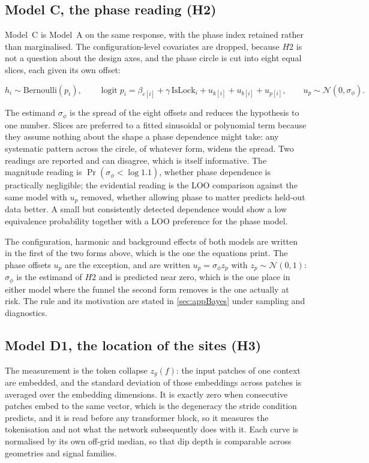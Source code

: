 \subsection{Model C, the phase reading (H2)}

Model~C is Model~A on the same response, with the phase index retained rather than marginalised. The configuration-level covariates are dropped, because $H2$ is not a question about the design axes, and the phase circle is cut into eight equal slices, each given its own offset:

\begin{equation*}
h_i \sim \mathrm{Bernoulli}(p_i),
\qquad
\operatorname{logit} p_i = \beta_{c[i]} + \gamma\,\mathrm{IsLock}_i + u_{k[i]} + u_{b[i]} + u_{p[i]},
\qquad
u_p \sim \mathcal{N}(0, \sigma_\phi).
\end{equation*}

The estimand $\sigma_\phi$ is the spread of the eight offsets and reduces the hypothesis to one number. Slices are preferred to a fitted sinusoidal or polynomial term because they assume nothing about the shape a phase dependence might take: any systematic pattern across the circle, of whatever form, widens the spread. Two readings are reported and can disagree, which is itself informative. The magnitude reading is $\Pr(\sigma_\phi<\log 1.1)$, whether phase dependence is practically negligible; the evidential reading is the LOO comparison against the same model with $u_p$ removed, whether allowing phase to matter predicts held-out data better. A small but consistently detected dependence would show a low equivalence probability together with a LOO preference for the phase model.

The configuration, harmonic and background effects of both models are written in the first of the two forms above, which is the one the equations print. The phase offsets $u_p$ are the exception, and are written $u_p=\sigma_\phi z_p$ with $z_p\sim\mathcal N(0,1)$: $\sigma_\phi$ is the estimand of $H2$ and is predicted near zero, which is the one place in either model where the funnel the second form removes is the one actually at risk. The rule and its motivation are stated in \autoref{sec:appBayes} under sampling and diagnostics.

\subsection{Model D1, the location of the sites (H3)}

The measurement is the token collapse $z_g(f)$: the input patches of one context are embedded, and the standard deviation of those embeddings across patches is averaged over the embedding dimensions. It is exactly zero when consecutive patches embed to the same vector, which is the degeneracy the stride condition predicts, and it is read before any transformer block, so it measures the tokenisation and not what the network subsequently does with it. Each curve is normalised by its own off-grid median, so that dip depth is comparable across geometries and signal families.

